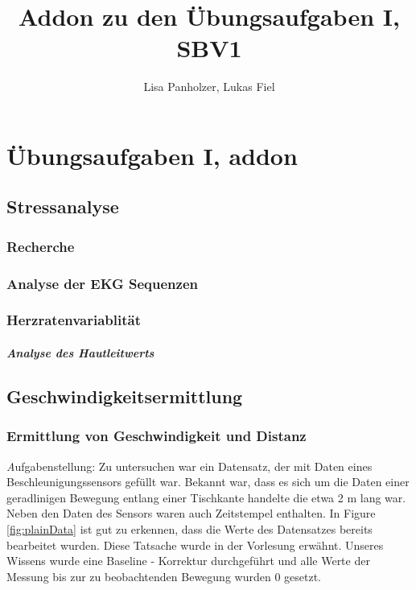\documentclass[12pt]{article}
\begin{document}
\title{Addon zu den Übungsaufgaben I, SBV1 }
\author{Lisa Panholzer, Lukas Fiel}
\maketitle


\newpage
\section{Übungsaufgaben I, addon}
\subsection{Stressanalyse}

\subsubsection{Recherche}

\subsubsection{Analyse der EKG Sequenzen}

\subsubsection{Herzratenvariablität}

\subparagraph{Analyse des Hautleitwerts}

\newpage
\subsection{Geschwindigkeitsermittlung}
\label{sec:Geschwindigkeitsermittlung}
\subsubsection{Ermittlung von Geschwindigkeit und Distanz}
\textit Aufgabenstellung:
Zu untersuchen war ein Datensatz, der mit Daten eines Beschleunigungssensors gefüllt war. Bekannt war, dass es sich um die Daten einer geradlinigen Bewegung entlang einer Tischkante handelte die etwa 2 m lang war. Neben den Daten des Sensors waren auch Zeitstempel enthalten. In Figure \ref{fig:plainData} ist gut zu erkennen, dass die Werte des Datensatzes bereits bearbeitet wurden. Diese Tatsache wurde in der Vorlesung erwähnt. Unseres Wissens wurde eine Baseline - Korrektur durchgeführt und alle Werte der Messung bis zur zu beobachtenden Bewegung wurden 0 gesetzt. 
\end{document}

